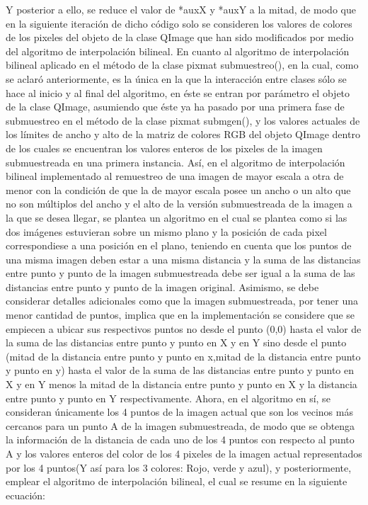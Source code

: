 \documentclass{article}
\begin{document}
Y posterior a ello, se reduce el valor de *auxX y *auxY a la mitad, de modo que en la siguiente iteración de dicho código solo se consideren los valores de colores de los pixeles del objeto de la clase QImage que han sido modificados por medio del algoritmo de interpolación bilineal. En cuanto al algoritmo de interpolación bilineal aplicado en el método de la clase pixmat submuestreo(), en la cual, como se aclaró anteriormente, es la única en la que la interacción entre clases sólo se hace al inicio y al final del algoritmo, en éste se entran por parámetro el objeto de la clase QImage, asumiendo que éste ya ha pasado por una primera fase de submuestreo en el método de la clase pixmat submgen(), y los valores actuales de los límites de ancho y alto de la matriz de colores RGB del objeto QImage dentro de los cuales se encuentran los valores enteros de los pixeles de la imagen submuestreada en una primera instancia. Así, en el algoritmo de interpolación bilineal implementado al remuestreo de una imagen de mayor escala a otra de menor con la condición de que la de mayor escala posee un ancho o un alto que no son múltiplos del ancho y el alto de la versión submuestreada de la imagen a la que se desea llegar, se plantea un algoritmo en el cual se plantea como si las dos imágenes estuvieran sobre un mismo plano y la posición de cada pixel correspondiese a una posición en el plano, teniendo en cuenta que los puntos de una misma imagen deben estar a una misma distancia y la suma de las distancias entre punto y punto de la imagen submuestreada debe ser igual a la suma de las distancias entre punto y punto de la imagen original. Asimismo, se debe considerar detalles adicionales como que la imagen submuestreada, por tener una menor cantidad de puntos, implica que en la implementación se considere que se empiecen a ubicar sus respectivos puntos no desde el punto (0,0) hasta el valor de la suma de las distancias entre punto y punto en X y en Y sino desde el punto (mitad de la distancia entre punto y punto en x,mitad de la distancia entre punto y punto en y) hasta el valor de la suma de las distancias entre punto y punto en X y en Y menos la mitad de la distancia entre punto y punto en X y la distancia entre punto y punto en Y respectivamente. Ahora, en el algoritmo en sí, se consideran únicamente los 4 puntos de la imagen actual que son los vecinos más cercanos para un punto A de la imagen submuestreada, de modo que se obtenga la información de la distancia de cada uno de los 4 puntos con respecto al punto A y los valores enteros del color de los 4 pixeles de la imagen actual representados por los 4 puntos(Y así para los 3 colores: Rojo, verde y azul), y posteriormente, emplear el algoritmo de interpolación bilineal, el cual se resume en la siguiente ecuación:
\end{document}
